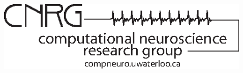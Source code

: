 \documentclass[final]{beamer}
\begin{document}
\begin{frame}[t]
\begin{columns}
\begin{column}{\paperwidth-339mm}
\begin{center}
                \vspace*{10mm}
                \insertauthor\par\insertinstitute%
            \end{center}
        \end{column}
        \begin{column}{190mm}
            \centering
            \hfill
            \\
            \includegraphics[width=187.7mm]{cnrg_logo}
        \end{column}
        \begin{column}{20mm}
        \end{column}
    \end{columns}
    \vspace*{20mm}


\end{frame}
\end{document}
